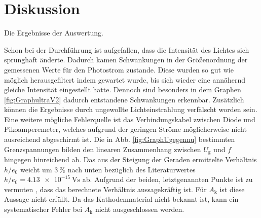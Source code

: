 
\section{Diskussion}
\label{sec:Diskussion}

 \begin{table}
  \centering
  \caption{Die Ergebnisse der Auswertung.}
  
 \end{table}

Schon bei der Durchführung ist aufgefallen, dass die Intensität des Lichtes sich
 sprunghaft änderte. Dadurch kamen Schwankungen in der Größenordnung der gemessenen
  Werte für den Photostrom zustande. Diese wurden so gut wie möglich herausgefiltert
   indem gewartet wurde, bis sich wieder eine annähernd gleiche Intensität eingestellt
   hatte. Dennoch sind besonders in dem Graphen \ref{fig:GraphultraV2} dadurch
   entstandene Schwankungen erkennbar. Zusätzlich können die Ergebnisse durch
   ungewollte Lichteinstrahlung verfälscht worden sein. Eine weitere mögliche Fehlerquelle
   ist das Verbindungskabel zwischen Diode und Pikoamperemeter, welches aufgrund der
   geringen Ströme möglicherweise nicht ausreichend abgeschirmt ist.
   Die in Abb. \ref{fig:GraphUgegennu} bestimmten Grenzspannungen
 bilden den linearen Zusammenhang zwischen $U_\text{g}$ und $f$ hingegen hinreichend ab. Das aus
   der Steigung der Geraden ermittelte Verhältnis $h/e_0$ weicht um
   $\SI{3}{\percent}$ nach unten bezüglich des Literaturwertes
   $h/e_0=\SI{4.13e-15}{\volt\second}$ \cite{nistgov} ab. Aufgrund der beiden, letztgenannten Punkte ist zu vermuten
, dass das berechnete Verhältnis aussagekräftig ist. Für $A_\text{k}$ ist diese Aussage nicht erfüllt. Da das Kathodenmaterial
nicht bekannt ist, kann ein systematischer Fehler bei $A_\text{k}$ nicht ausgeschlossen werden. 
